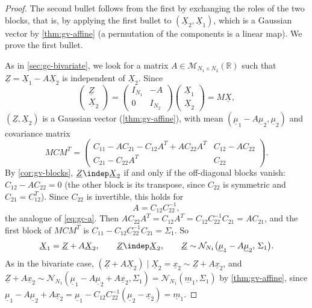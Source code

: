 \begin{proof}
The second bullet follows from the first by exchanging the roles of the two blocks, that is, by
applying the first bullet to $(\underline X_2,\underline X_1)$, which is a Gaussian vector by \cref{thm:gv-affine} (a
permutation of the components is a linear map). We prove the first bullet.

As in \cref{sec:gc-bivariate}, we look for a matrix $A\in\mathcal M_{N_1\times N_2}(\mathbb R)$ such
that $\underline Z=\underline X_1-A\underline X_2$ is independent of $\underline X_2$. Since
\[
  \begin{pmatrix}\underline Z\\\underline X_2\end{pmatrix}=\begin{pmatrix}I_{N_1}&-A\\0&I_{N_2}\end{pmatrix}
  \begin{pmatrix}\underline X_1\\\underline X_2\end{pmatrix}=M\underline X,
\]
$(\underline Z,\underline X_2)$ is a Gaussian vector (\cref{thm:gv-affine}), with mean $(\underline\mu_1-A\underline\mu_2,\underline\mu_2)$ and covariance
matrix
\[
  MCM^T=\begin{pmatrix}C_{11}-AC_{21}-C_{12}A^T+AC_{22}A^T&C_{12}-AC_{22}\\
  C_{21}-C_{22}A^T&C_{22}\end{pmatrix}.
\]
By \cref{cor:gv-blocks}, $\underline Z\indep\underline X_2$ if and only if the off-diagonal blocks vanish:
$C_{12}-AC_{22}=0$ (the other block is its transpose, since $C_{22}$ is symmetric and
$C_{21}=C_{12}^T$). Since $C_{22}$ is invertible, this holds for
\[
  A=C_{12}C_{22}^{-1},
\]
the analogue of \eqref{eq:gc-a}. Then $AC_{22}A^T=C_{12}A^T=C_{12}C_{22}^{-1}C_{21}=AC_{21}$, and the
first block of $MCM^T$ is $C_{11}-C_{12}C_{22}^{-1}C_{21}=\Sigma_1$. So
\[
  \underline X_1=\underline Z+A\underline X_2,\qquad \underline Z\indep\underline X_2,\qquad \underline Z\sim\mathcal N_{N_1}\big(\underline\mu_1-A\underline\mu_2,\,\Sigma_1\big).
\]
As in the bivariate case, $(\underline Z+A\underline X_2)\mid\underline X_2=\underline x_2\sim\underline Z+A\underline x_2$, and
$\underline Z+A\underline x_2\sim\mathcal N_{N_1}(\underline\mu_1-A\underline\mu_2+A\underline x_2,\Sigma_1)=\mathcal N_{N_1}(\underline m_1,\Sigma_1)$ by
\cref{thm:gv-affine}, since $\underline\mu_1-A\underline\mu_2+A\underline x_2=\underline\mu_1-C_{12}C_{22}^{-1}(\underline\mu_2-\underline x_2)=\underline m_1$.


\end{proof}
